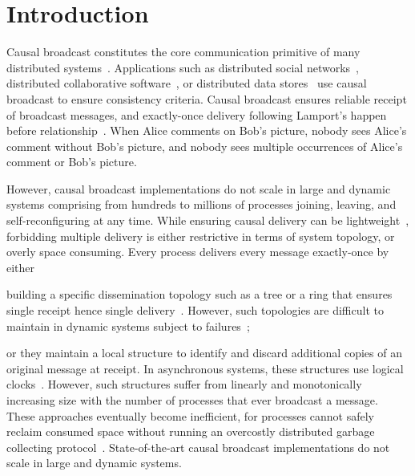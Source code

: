  
\section{Introduction}


Causal broadcast constitutes the core communication primitive
of many distributed systems~\cite{hadzilacos1994modular}. Applications such as
distributed social networks~\cite{borthakur2013petabyte}, distributed
collaborative software~\cite{heinrich2012exploiting,nedelec2016crate}, or
distributed data
stores~\cite{bailis2013bolton,bravo2017saturn,demers1987epidemic,lloyd2011cops,shapiro2011comprehensive}
use causal broadcast to ensure consistency criteria.  Causal broadcast ensures
reliable receipt of broadcast messages, and exactly-once delivery following
Lamport's happen before relationship~\cite{lamport1978time}. When Alice comments
on Bob's picture, nobody sees Alice's comment without Bob's picture, and nobody
sees multiple occurrences of Alice's comment or Bob's picture.

However, causal broadcast implementations do not scale in large and dynamic
systems comprising from hundreds to millions of processes joining, leaving, and
self-reconfiguring at any time. While ensuring causal delivery can be
lightweight~\cite{nedelec2018pcbroadcast}, forbidding multiple delivery is
either restrictive in terms of system topology, or overly space consuming. Every
process delivers every message exactly-once by either
\begin{inparaenum}[(i)]
\item building a specific dissemination topology such as a tree or a ring that
  ensures single receipt hence single
  delivery~\cite{bravo2017saturn,raynal2013distributed}. However, such
  topologies are difficult to maintain in dynamic systems subject to
  failures~\cite{krasikova2016hashtable};
\item or they maintain a local structure to identify and discard additional
  copies of an original message at receipt. In asynchronous systems, these
  structures use logical clocks~\cite{malkhi2007concise,mukund2014optimized}.
  However, such structures suffer from linearly and monotonically increasing
  size with the number of processes that ever broadcast a message.  These
  approaches eventually become inefficient, for processes cannot safely reclaim
  consumed space without running an overcostly distributed garbage collecting
  protocol~\cite{abdullahi1998garbage}. State-of-the-art causal broadcast
  implementations do not scale in large and dynamic systems.
\end{inparaenum}

